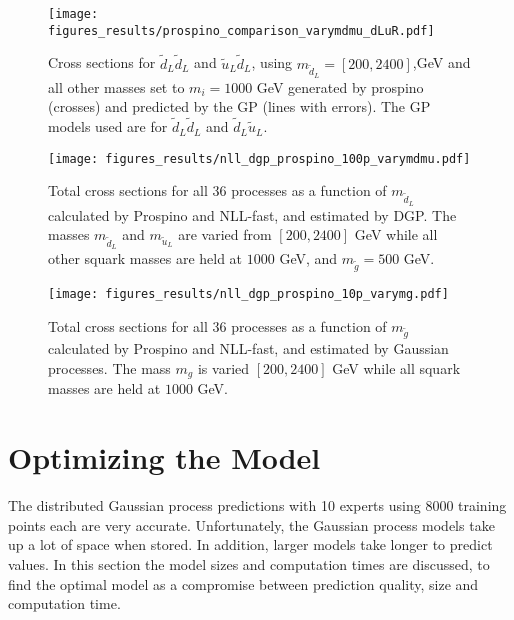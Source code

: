 \documentclass[twoside,english]{uiofysmaster}
\begin{document}
\begin{figure}
\centering
\texttt{[image: figures\_results/prospino\_comparison\_varymdmu\_dLuR.pdf]}
\caption{Cross sections for $\widetilde{d}_L \widetilde{d}_L$ and $\widetilde{u}_L \widetilde{d}_L$, using $m_{\widetilde{d}_L}=[200, 2400]$,GeV and all other masses set to $m_i = 1000$ GeV generated by prospino (crosses) and predicted by the GP (lines with errors). The GP models used are for $\widetilde{d}_L \widetilde{d}_L$ and $\widetilde{d}_L \widetilde{u}_L$.}
\label{Fig:: results : dLuL uLuL prospino dgp}
\end{figure}


\begin{figure}
\centering
\texttt{[image: figures\_results/nll\_dgp\_prospino\_100p\_varymdmu.pdf]}
\caption{Total cross sections for all 36 processes as a function of $m_{\widetilde{d}_L}$ calculated by Prospino and NLL-fast, and estimated by DGP. The masses $m_{\widetilde{d}_L}$ and $m_{\widetilde{u}_L}$ are varied from $[200, 2400]$ GeV while all other squark masses are held at $1000$ GeV, and $m_{\widetilde{g}}=500$ GeV.}
\label{Fig:: results : Total cross sections dgp prospino nll}
\end{figure}

\begin{figure}
\centering
\texttt{[image: figures\_results/nll\_dgp\_prospino\_10p\_varymg.pdf]}
\caption{Total cross sections for all 36 processes as a function of $m_{\widetilde{g}}$ calculated by Prospino and NLL-fast, and estimated by Gaussian processes. The mass $m_{g}$ is varied $[200, 2400]$ GeV while all squark masses are held at $1000$ GeV.}
\label{Fig:: results : Total cross sections varymg dgp prospino nll}
\end{figure}





\section{Optimizing the Model}\label{Sec:: results : The Optimal Model}

The distributed Gaussian process predictions with 10 experts using 8000 training points each are very accurate. Unfortunately, the Gaussian process models take up a lot of space when stored. In addition, larger models take longer to predict values. In this section the model sizes and computation times are discussed, to find the optimal model as a compromise between prediction quality, size and computation time.
\end{document}
